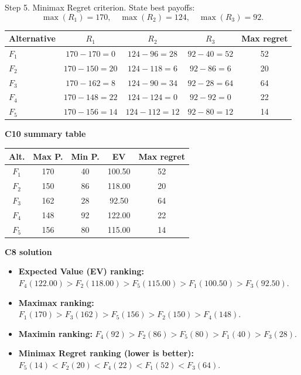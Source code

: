 \begin{ExamProblems}
		Step 5. Minimax Regret criterion.
		State best payoffs:
		\[
		\max(R_1)=170,\quad \max(R_2)=124,\quad \max(R_3)=92.
		\]
		\begin{center}
			\begin{tabular}{l c c c c}
				\toprule
				Alternative & $R_1$ & $R_2$ & $R_3$ & Max regret \\
				\midrule
				$F_1$ & $170-170=0$ & $124-96=28$ & $92-40=52$ & 52 \\
				$F_2$ & $170-150=20$ & $124-118=6$ & $92-86=6$ & 20 \\
				$F_3$ & $170-162=8$ & $124-90=34$ & $92-28=64$ & 64 \\
				$F_4$ & $170-148=22$ & $124-124=0$ & $92-92=0$ & 22 \\
				$F_5$ & $170-156=14$ & $124-112=12$ & $92-80=12$ & 14 \\
				\bottomrule
			\end{tabular}
		\end{center}

		\textbf{C10 summary table}
		\begin{center}
			\begin{tabular}{c c c c c}
				\toprule
				Alt. & Max P. & Min P. & EV & Max regret \\
				\midrule
				$F_1$ & 170 & 40 & 100.50 & 52 \\
				$F_2$ & 150 & 86 & 118.00 & 20 \\
				$F_3$ & 162 & 28 & 92.50 & 64 \\
				$F_4$ & 148 & 92 & 122.00 & 22 \\
				$F_5$ & 156 & 80 & 115.00 & 14 \\
				\bottomrule
			\end{tabular}
		\end{center}

		\textbf{C8 solution}
		\begin{itemize}
			\item \textbf{Expected Value (EV) ranking:} $F_4(122.00)>F_2(118.00)>F_5(115.00)>F_1(100.50)>F_3(92.50)$.
			\item \textbf{Maximax ranking:} $F_1(170)>F_3(162)>F_5(156)>F_2(150)>F_4(148)$.
			\item \textbf{Maximin ranking:} $F_4(92)>F_2(86)>F_5(80)>F_1(40)>F_3(28)$.
			\item \textbf{Minimax Regret ranking (lower is better):} $F_5(14)<F_2(20)<F_4(22)<F_1(52)<F_3(64)$.
		\end{itemize}


\end{ExamProblems}

